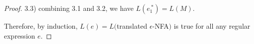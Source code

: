 \begin{proof}
\par 3.3) combining 3.1 and 3.2, we have \(L(e_1^{\ *}) = L(M)\). 

\par \noindent Therefore, by induction, \(L(e) = L(\)translated
\(\epsilon\)-NFA\()\) is true for all any regular expression \(e\). 
\end{proof}
